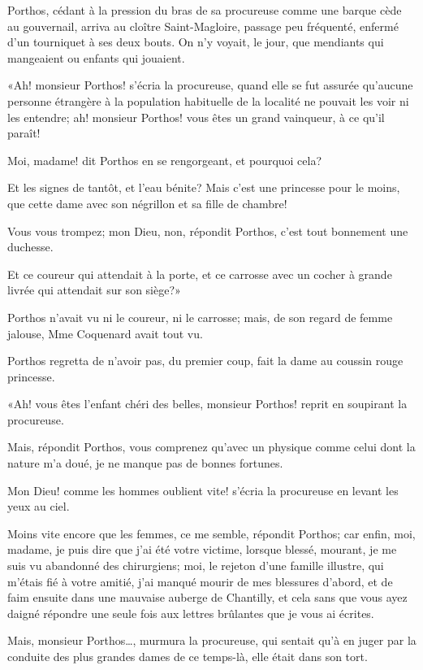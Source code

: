 Porthos, cédant à la pression du bras de sa procureuse comme une barque cède au gouvernail, arriva au cloître Saint-Magloire, passage peu fréquenté, enfermé d'un tourniquet à ses deux bouts. On n'y voyait, le jour, que mendiants qui mangeaient ou enfants qui jouaient. 

«Ah! monsieur Porthos! s'écria la procureuse, quand elle se fut assurée qu'aucune personne étrangère à la population habituelle de la localité ne pouvait les voir ni les entendre; ah! monsieur Porthos! vous êtes un grand vainqueur, à ce qu'il paraît! 

\speak  Moi, madame! dit Porthos en se rengorgeant, et pourquoi cela? 

\speak  Et les signes de tantôt, et l'eau bénite? Mais c'est une princesse pour le moins, que cette dame avec son négrillon et sa fille de chambre! 

\speak  Vous vous trompez; mon Dieu, non, répondit Porthos, c'est tout bonnement une duchesse. 

\speak  Et ce coureur qui attendait à la porte, et ce carrosse avec un cocher à grande livrée qui attendait sur son siège?» 

Porthos n'avait vu ni le coureur, ni le carrosse; mais, de son regard de femme jalouse, Mme Coquenard avait tout vu. 

Porthos regretta de n'avoir pas, du premier coup, fait la dame au coussin rouge princesse. 

«Ah! vous êtes l'enfant chéri des belles, monsieur Porthos! reprit en soupirant la procureuse. 

\speak  Mais, répondit Porthos, vous comprenez qu'avec un physique comme celui dont la nature m'a doué, je ne manque pas de bonnes fortunes. 

\speak  Mon Dieu! comme les hommes oublient vite! s'écria la procureuse en levant les yeux au ciel. 

\speak  Moins vite encore que les femmes, ce me semble, répondit Porthos; car enfin, moi, madame, je puis dire que j'ai été votre victime, lorsque blessé, mourant, je me suis vu abandonné des chirurgiens; moi, le rejeton d'une famille illustre, qui m'étais fié à votre amitié, j'ai manqué mourir de mes blessures d'abord, et de faim ensuite dans une mauvaise auberge de Chantilly, et cela sans que vous ayez daigné répondre une seule fois aux lettres brûlantes que je vous ai écrites. 

\speak  Mais, monsieur Porthos\dots, murmura la procureuse, qui sentait qu'à en juger par la conduite des plus grandes dames de ce temps-là, elle était dans son tort. 

